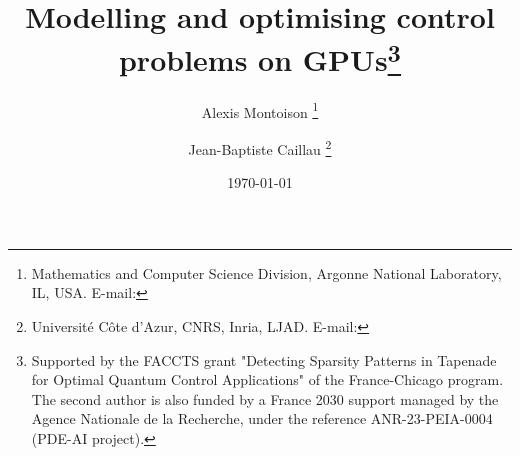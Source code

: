 \documentclass[twoside,leqno,twocolumn]{article}
\begin{document}
%
\newcommand\relatedversion{}


\title{%
  Modelling and optimising control problems on GPUs\thanks{%
  Supported by the FACCTS grant "Detecting Sparsity Patterns in Tapenade for Optimal Quantum Control Applications" of the France-Chicago program. The second author is also funded by a France 2030 support managed by the Agence Nationale de la Recherche, under the reference ANR-23-PEIA-0004 (PDE-AI project).}
}

\author{%
  Alexis Montoison%
  \thanks{%
    Mathematics and Computer Science Division, Argonne National Laboratory, IL, USA.
    E-mail: 
  }
  \and
  Jean-Baptiste Caillau%
  \thanks{%
    Universit\'e C\^ote d'Azur, CNRS, Inria, LJAD.
    E-mail: 
  }
}
\date{\today}

\maketitle




\end{document}
